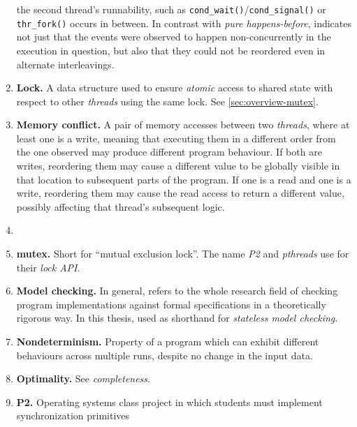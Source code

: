 \begin{enumerate}
		the second thread's runnability, such as {\tt cond\_wait()}/{\tt cond\_signal()} or {\tt thr\_fork()}
		occurs in between.
		In contrast with {\em pure happens-before},
		indicates not just that the events were observed
		to happen non-concurrently in the execution in question,
		but also that they could not be reordered even in alternate interleavings.
	\item {\bf Lock.}
		A data structure used to ensure {\em atomic} access to shared state
		with respect to other {\em threads} using the same lock.
		See \cref{sec:overview-mutex}.
	\item {\bf Memory conflict.}
		A pair of memory accesses between two {\em threads}, where at least one is a write,
		meaning that executing them in a different order from the one observed may produce different program behaviour.
		If both are writes, reordering them may cause a different value to be globally visible in that location
		to subsequent parts of the program.
		If one is a read and one is a write, reordering them may cause the read access to return a different value,
		possibly affecting that thread's subsequent logic.
	\item {}
	\item {\bf mutex.}
		Short for ``mutual exclusion lock''. The name {\em P2} and {\em pthreads} use for their {\em lock API}.
	\item {\bf Model checking.}
		In general, refers to the whole research field of checking program implementations against
		formal specifications in a theoretically rigorous way.
		In this thesis, used as shorthand for {\em stateless model checking}.
	\item {\bf Nondeterminism.}
		Property of a program which can exhibit different behaviours across multiple runs,
		despite no change in the input data.
	\item {\bf Optimality.} See {\em completeness}.
	\item {\bf P2.}
		Operating systems class project in which students must implement synchronization primitives

\end{enumerate}
